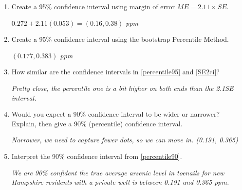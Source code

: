 \begin{enumerate}
\item \label{SE2ci} Create a 95\% confidence interval using margin of
  error $ME =  2.11  \times SE$.
\begin{students}
  \vspace{1cm}
\end{students}

\begin{key}
  {\it $ 0.272 \pm 2.11(0.053) = (0.16, 0.38)$ ppm}
\end{key}

\item  \label{percentile95} Create a 95\% confidence interval using
  the bootstrap   Percentile Method.
\begin{students}
  \vspace{1cm}
\end{students}

\begin{key}
  {\it $ (0.177, 0.383)$ ppm}
\end{key}

\item  How similar are the confidence intervals in \ref{percentile95}
  and \ref{SE2ci}?
\begin{students}
  \vspace{1cm}
\end{students}

\begin{key}
  {\it Pretty close, the percentile one is a bit higher on both ends
    than the 2.1SE interval.}
\end{key}


\item \label{percentile90}Would you expect a 90\% confidence interval
  to be wider or narrower?  Explain, then give a 90\% (percentile)
  confidence interval.
\begin{students}
  \vspace{2cm}
\end{students}

\begin{key}
  {\it Narrower, we need to capture fewer dots, so we can move in.
    (0.191, 0.365)} 
\end{key}

\item  Interpret the 90\% confidence interval from \ref{percentile90}.
\begin{students}
  \vspace{2cm}
\end{students}

\begin{key}
  {\it We are 90\% confident the true average arsenic level in
    toenails for new Hampshire residents  with a private well is
    between 0.191 and 0.365 ppm. }
\end{key}
\end{enumerate}



